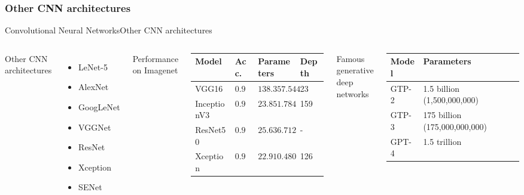 \documentclass[10pt,compress]{beamer} %
\begin{document}
\subsubsection{Other CNN architectures}
\begin{frame}{Convolutional Neural Networks}{Other CNN architectures}
    \begin{columns}
    Other CNN architectures
    \begin{itemize}
        \item LeNet-5
        \item AlexNet
        \item GoogLeNet
        \item VGGNet
        \item ResNet
        \item Xception
        \item SENet
    \end{itemize}

	Performance on Imagenet
	    \smallskip
    \begin{tabular}{l|l|l|l}
    Model & Acc. & Parameters & Depth\\\hline
    VGG16       & $0.901$ & $138.357.544$ & 23 \\
    InceptionV3 & $0.937$ & $23.851.784$ & 159 \\
    ResNet50    & $0.921$ & $25.636.712$ & -   \\
    Xception    & $0.945$ & $22.910.480$ & 126 \\
    \end{tabular}

    \bigskip

    Famous generative deep networks
    \smallskip
    \begin{tabular}{l|l}
    Model & Parameters  \\\hline
    GTP-2 & 1.5 billion (1,500,000,000) \\
    GTP-3 & 175 billion (175,000,000,000) \\
    GPT-4 & 1.5 trillion\\
    \end{tabular}

    \end{columns}
\end{frame}
\end{document}
